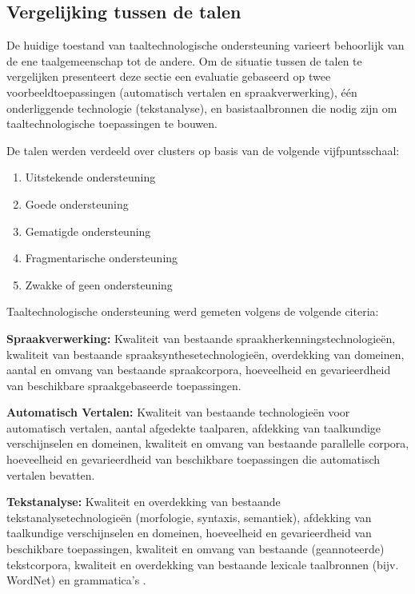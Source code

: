\documentclass[]{../../metanetpaper}
\begin{document}
\begin{multicols}{2}
{\subsection{Vergelijking tussen de talen}

De huidige toestand van taaltechnologische ondersteuning  varieert behoorlijk van de ene taalgemeenschap tot de andere. Om de situatie tussen de talen te vergelijken presenteert deze sectie een evaluatie gebaseerd op twee voorbeeldtoepassingen (automatisch vertalen en spraakverwerking), {\'e}{\'e}n onderliggende technologie (tekstanalyse), en basistaalbronnen die nodig zijn om taaltechnologische toepassingen te bouwen.

De talen werden verdeeld over clusters op basis van de volgende vijfpuntsschaal:

\begin{enumerate}
\item Uitstekende ondersteuning
\item Goede ondersteuning
\item Gematigde ondersteuning
\item  Fragmentarische ondersteuning
\item Zwakke of geen ondersteuning
\end{enumerate}

Taaltechnologische ondersteuning werd gemeten volgens de volgende citeria:

\textbf{Spraakverwerking:} Kwaliteit van bestaande spraakherkenningstechnologie{\"e}n, kwaliteit van bestaande spraaksynthesetechnologie{\"e}n, overdekking van domeinen, aantal en omvang van bestaande spraakcorpora, hoeveelheid en gevarieerdheid van beschikbare spraakgebaseerde toepassingen.

\textbf{Automatisch Vertalen:} Kwaliteit van bestaande technologie{\"e}n voor automatisch vertalen, aantal afgedekte taalparen, afdekking van taalkundige verschijnselen en domeinen, kwaliteit en omvang van bestaande parallelle corpora, hoeveelheid en gevarieerdheid van beschikbare  toepassingen die automatisch vertalen bevatten.

\textbf{Tekstanalyse:} Kwaliteit en overdekking van bestaande tekstanalysetechnologie{\"e}n (morfologie, syntaxis, semantiek), afdekking van taalkundige verschijnselen en domeinen, hoeveelheid en gevarieerdheid van beschikbare  toepassingen, kwaliteit en omvang van bestaande (geannoteerde) tekstcorpora, kwaliteit en overdekking van bestaande lexicale taalbronnen (bijv. WordNet) en grammatica's .

}
\end{multicols}
\end{document}
